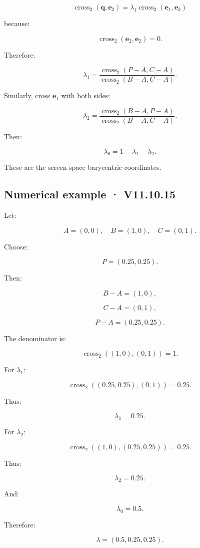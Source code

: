 \[
 \operatorname{cross}_2(\mathbf q,\mathbf e_2) = \lambda_1 \operatorname{cross}_2(\mathbf e_1,\mathbf e_2)
\]

because:

\[
 \operatorname{cross}_2(\mathbf e_2,\mathbf e_2)=0.
\]

Therefore:

\[
 \boxed{ \lambda_1= \frac{ \operatorname{cross}_2(P-A,C-A) }{ \operatorname{cross}_2(B-A,C-A) } }.
\]

Similarly, cross \(\mathbf e_1\) with both sides:

\[
 \boxed{ \lambda_2= \frac{ \operatorname{cross}_2(B-A,P-A) }{ \operatorname{cross}_2(B-A,C-A) } }.
\]

Then:

\[
 \boxed{ \lambda_0=1-\lambda_1-\lambda_2 }.
\]

These are the screen-space barycentric coordinates.

\subsection{Numerical example · V11.10.15}\label{02-foundations-ii-ch034-numerical-example-v11.10.15}

Let:

\[
 A=(0,0),\quad B=(1,0),\quad C=(0,1).
\]

Choose:

\[
 P=(0.25,0.25).
\]

Then:

\[
 B-A=(1,0),
\]

\[
 C-A=(0,1),
\]

\[
 P-A=(0.25,0.25).
\]

The denominator is:

\[
 \operatorname{cross}_2((1,0),(0,1))=1.
\]

For \(\lambda_1\):

\[
 \operatorname{cross}_2((0.25,0.25),(0,1))=0.25.
\]

Thus:

\[
 \lambda_1=0.25.
\]

For \(\lambda_2\):

\[
 \operatorname{cross}_2((1,0),(0.25,0.25))=0.25.
\]

Thus:

\[
 \lambda_2=0.25.
\]

And:

\[
 \lambda_0=0.5.
\]

Therefore:

\[
 \boxed{ \lambda=(0.5,0.25,0.25) }.
\]

